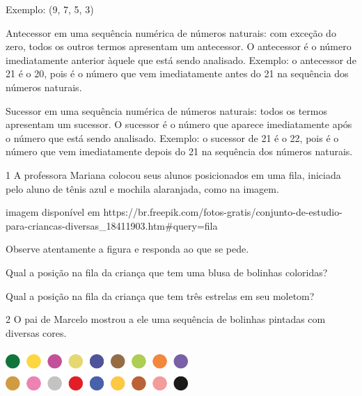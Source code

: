 \begin{escolha}
Exemplo: (9, 7, 5, 3)

Antecessor em uma sequência numérica de números naturais: com exceção do zero,
todos os outros termos apresentam um antecessor. O antecessor é o número
imediatamente anterior àquele que está sendo analisado. Exemplo: o
antecessor de 21 é o 20, pois é o número que vem imediatamente antes do 21 na sequência dos números naturais.

Sucessor em uma sequência numérica de números naturais: todos os termos
apresentam um sucessor. O sucessor é o número que aparece imediatamente após o número que está sendo analisado. Exemplo: o sucessor de 21 é o 22, pois é o
número que vem imediatamente depois do 21 na sequência dos números naturais.


\num{1} A professora Mariana colocou seus alunos posicionados em uma fila, iniciada pelo aluno de tênis azul e mochila alaranjada, como na imagem.

\inserir imagem disponível em https://br.freepik.com/fotos-gratis/conjunto-de-estudio-para-criancas-diversas_18411903.htm#query=fila%

Observe atentamente a figura e responda ao que se pede.

\begin{escolha}

  \item Qual a posição na fila da criança que tem uma blusa de bolinhas coloridas?


  \item Qual a posição na fila da criança que tem três estrelas em seu moletom?


\end{escolha}

\num{2} O pai de Marcelo mostrou a ele uma sequência de bolinhas pintadas com
diversas cores.


\includegraphics[width=2.72524in,height=0.68339in]{media/image28.png}


\end{escolha}
